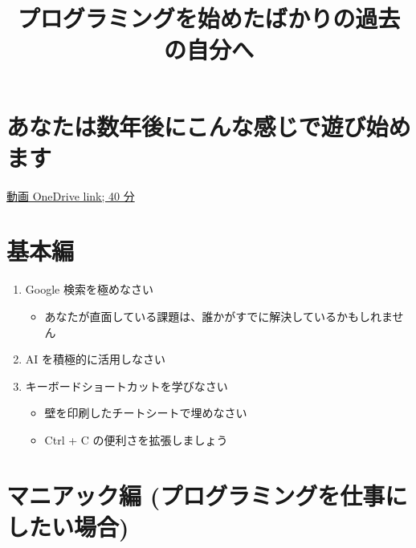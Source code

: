 \documentclass[a4paper,11pt,uplatex]{jsarticle}
\title{プログラミングを始めたばかりの過去の自分へ}
\author{}
\date{}
\begin{document}
\maketitle

\section*{あなたは数年後にこんな感じで遊び始めます}
\href{https://photos.onedrive.com/share/12F1169924695EF9!250373?cid=12F1169924695EF9&resId=12F1169924695EF9!250373&authkey=!AEcanzCk1fx4cYI&ithint=video&e=TjlgN1}{動画 OneDrive link; 40 分}

\section{基本編}
\begin{enumerate}
    \item Google 検索を極めなさい
    \begin{itemize}
        \item あなたが直面している課題は、誰かがすでに解決しているかもしれません
    \end{itemize}
    \item AI を積極的に活用しなさい
    \item キーボードショートカットを学びなさい
    \begin{itemize}
        \item 壁を印刷したチートシートで埋めなさい
        \item Ctrl + C の便利さを拡張しましょう
    \end{itemize}
\end{enumerate}

\section{マニアック編 (プログラミングを仕事にしたい場合)}
\end{document}

